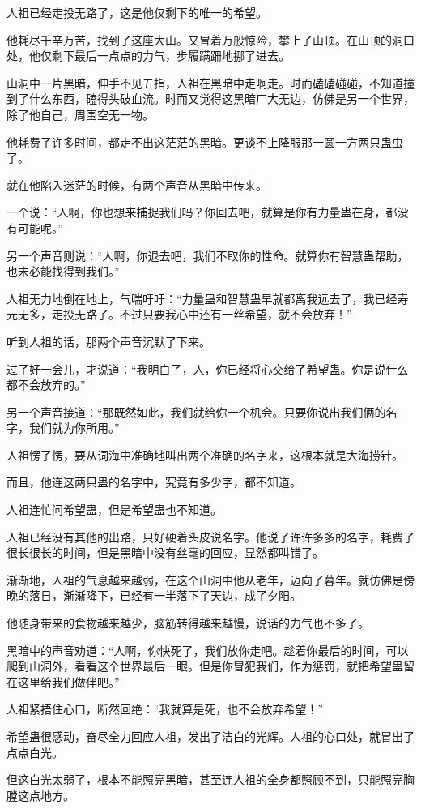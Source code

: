 \begin{this_body}
人祖已经走投无路了，这是他仅剩下的唯一的希望。

他耗尽千辛万苦，找到了这座大山。又冒着万般惊险，攀上了山顶。在山顶的洞口处，他仅剩下最后一点点的力气，步履蹒跚地挪了进去。

山洞中一片黑暗，伸手不见五指，人祖在黑暗中走啊走。时而磕磕碰碰，不知道撞到了什么东西，磕得头破血流。时而又觉得这黑暗广大无边，仿佛是另一个世界，除了他自己，周围空无一物。

他耗费了许多时间，都走不出这茫茫的黑暗。更谈不上降服那一圆一方两只蛊虫了。

就在他陷入迷茫的时候，有两个声音从黑暗中传来。

一个说：“人啊，你也想来捕捉我们吗？你回去吧，就算是你有力量蛊在身，都没有可能呢。”

另一个声音则说：“人啊，你退去吧，我们不取你的性命。就算你有智慧蛊帮助，也未必能找得到我们。”

人祖无力地倒在地上，气喘吁吁：“力量蛊和智慧蛊早就都离我远去了，我已经寿元无多，走投无路了。不过只要我心中还有一丝希望，就不会放弃！”

听到人祖的话，那两个声音沉默了下来。

过了好一会儿，才说道：“我明白了，人，你已经将心交给了希望蛊。你是说什么都不会放弃的。”

另一个声音接道：“那既然如此，我们就给你一个机会。只要你说出我们俩的名字，我们就为你所用。”

人祖愣了愣，要从词海中准确地叫出两个准确的名字来，这根本就是大海捞针。

而且，他连这两只蛊的名字中，究竟有多少字，都不知道。

人祖连忙问希望蛊，但是希望蛊也不知道。

人祖已经没有其他的出路，只好硬着头皮说名字。他说了许许多多的名字，耗费了很长很长的时间，但是黑暗中没有丝毫的回应，显然都叫错了。

渐渐地，人祖的气息越来越弱，在这个山洞中他从老年，迈向了暮年。就仿佛是傍晚的落日，渐渐降下，已经有一半落下了天边，成了夕阳。

他随身带来的食物越来越少，脑筋转得越来越慢，说话的力气也不多了。

黑暗中的声音劝道：“人啊，你快死了，我们放你走吧。趁着你最后的时间，可以爬到山洞外，看看这个世界最后一眼。但是你冒犯我们，作为惩罚，就把希望蛊留在这里给我们做伴吧。”

人祖紧捂住心口，断然回绝：“我就算是死，也不会放弃希望！”

希望蛊很感动，奋尽全力回应人祖，发出了洁白的光辉。人祖的心口处，就冒出了点点白光。

但这白光太弱了，根本不能照亮黑暗，甚至连人祖的全身都照顾不到，只能照亮胸膛这点地方。


\end{this_body}
